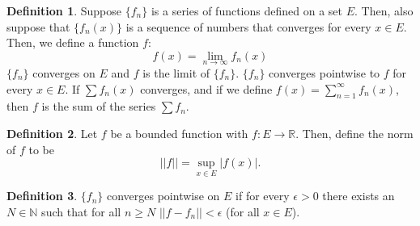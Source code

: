 \documentclass[12pt]{article}
\theoremstyle{definition}
\newtheorem{definition}{Definition}
\theoremstyle{named}
\begin{document}
\renewcommand{\thedefinition}{7.1}
\begin{definition}
    Suppose $\{f_n\}$ is a series of functions defined on a set $E$. Then, also suppose that $\{f_n(x)\}$ is a sequence of numbers that converges for every $x \in E$. Then, we define a function $f$: 
    $$
    f(x) = \lim_{n \to \infty} f_n(x)
    $$
    $\{f_n\}$ converges on $E$ and $f$ is the limit of $\{f_n\}$. $\{f_n\}$ converges pointwise to $f$ for every $x \in E$. If $\sum f_n(x)$ converges, and if we define $f(x) = \sum_{n=1}^{\infty} f_n(x)$, then $f$ is the sum of the series $\sum f_n$. 
\end{definition}

\renewcommand{\thedefinition}{of Norm}
\begin{definition}
    Let $f$ be a bounded function with $f: E \to \mathbb{R}$. Then, define the norm of $f$ to be 
    $$
    ||f|| = \sup_{x\in E} |f(x)|.
    $$
\end{definition}

\renewcommand{\thedefinition}{7.7}
\begin{definition}
    $\{f_n\}$ converges pointwise on $E$ if for every $\epsilon > 0$ there exists an $N \in \mathbb{N}$ such that for all $n \geq N$ $||f - f_n|| < \epsilon$ (for all $x \in E$). 
\end{definition}
\end{document}
